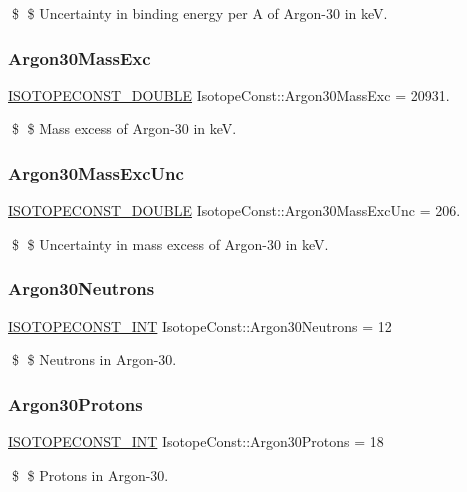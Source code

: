 \$ \$ Uncertainty in binding energy per A of Argon-\/30 in keV. \mbox{\label{group___isotope_const-_argon-_ar30_ga42a0555c8307fb3c22a2a312eea7e055}} 
\subsubsection{\texorpdfstring{Argon30\+Mass\+Exc}{Argon30MassExc}}
{\footnotesize\ttfamily \mbox{\hyperlink{group___isotope_const-_macros_ga8f45a7272ce02c0b4c65c44636ed719a}{I\+S\+O\+T\+O\+P\+E\+C\+O\+N\+S\+T\+\_\+\+D\+O\+U\+B\+LE}} Isotope\+Const\+::\+Argon30\+Mass\+Exc = 20931.}

\$ \$ Mass excess of Argon-\/30 in keV. \mbox{\label{group___isotope_const-_argon-_ar30_ga7834985eafd1728369d803a951ee6903}} 
\subsubsection{\texorpdfstring{Argon30\+Mass\+Exc\+Unc}{Argon30MassExcUnc}}
{\footnotesize\ttfamily \mbox{\hyperlink{group___isotope_const-_macros_ga8f45a7272ce02c0b4c65c44636ed719a}{I\+S\+O\+T\+O\+P\+E\+C\+O\+N\+S\+T\+\_\+\+D\+O\+U\+B\+LE}} Isotope\+Const\+::\+Argon30\+Mass\+Exc\+Unc = 206.}

\$ \$ Uncertainty in mass excess of Argon-\/30 in keV. \mbox{\label{group___isotope_const-_argon-_ar30_ga5febf3c83dcf4120078f83ef6531fff5}} 
\subsubsection{\texorpdfstring{Argon30\+Neutrons}{Argon30Neutrons}}
{\footnotesize\ttfamily \mbox{\hyperlink{group___isotope_const-_macros_ga5f18360b3e99483a35c32d789e62621c}{I\+S\+O\+T\+O\+P\+E\+C\+O\+N\+S\+T\+\_\+\+I\+NT}} Isotope\+Const\+::\+Argon30\+Neutrons = 12}

\$ \$ Neutrons in Argon-\/30. \mbox{\label{group___isotope_const-_argon-_ar30_ga456754bdbd44996debaf5e08cedc75d2}} 
\subsubsection{\texorpdfstring{Argon30\+Protons}{Argon30Protons}}
{\footnotesize\ttfamily \mbox{\hyperlink{group___isotope_const-_macros_ga5f18360b3e99483a35c32d789e62621c}{I\+S\+O\+T\+O\+P\+E\+C\+O\+N\+S\+T\+\_\+\+I\+NT}} Isotope\+Const\+::\+Argon30\+Protons = 18}

\$ \$ Protons in Argon-\/30. 